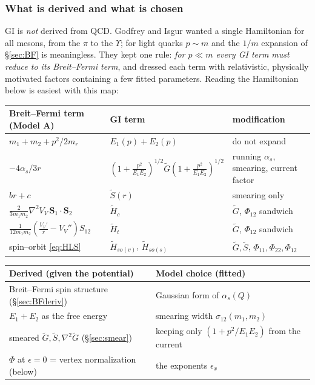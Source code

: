 \documentclass[11pt,a4paper]{article}
\numberwithin{equation}{section}
\theoremstyle{definition}
\theoremstyle{plain}
\theoremstyle{remark}
\numberwithin{algorithm}{section}
\newcommand{\vS}{\bm S}
\newcommand{\as}{\alpha_s}
\newcommand{\mr}{m_r}
\begin{document}
\subsubsection{What is derived and what is chosen}
GI is \emph{not} derived from QCD. Godfrey and Isgur wanted a single Hamiltonian for all mesons, from the $\pi$ to the $\Upsilon$; for light quarks $p\sim m$ and the $1/m$ expansion of \S\ref{sec:BF} is meaningless. They kept one rule: \emph{for $p\ll m$ every GI term must reduce to its Breit--Fermi term}, and dressed each term with relativistic, physically motivated factors containing a few fitted parameters. Reading the Hamiltonian below is easiest with this map:
\begin{center}\small
\renewcommand{\arraystretch}{1.3}
\begin{tabular}{@{}p{4.6cm}p{5.6cm}p{4.2cm}@{}}\toprule
Breit--Fermi term (Model A) & GI term & modification\\\midrule
$m_1+m_2+p^2/2\mr$ & $E_1(p)+E_2(p)$ & do not expand\\
$-4\as/3r$ & $(1+\frac{p^2}{E_1E_2})^{1/2}\tilde G(1+\frac{p^2}{E_1E_2})^{1/2}$ & running $\as$, smearing, current factor\\
$br+c$ & $\tilde S(r)$ & smearing only\\
$\frac{2}{3m_1m_2}\nabla^2V_V\,\vS_1\cdot\vS_2$ & $\tilde H_c$ & $\tilde G$, $\Phi_{12}$ sandwich\\
$\frac{1}{12m_1m_2}(\frac{V_V'}r-V_V'')S_{12}$ & $\tilde H_t$ & $\tilde G$, $\Phi_{12}$ sandwich\\
spin--orbit \eqref{eq:HLS} & $\tilde H_{so(v)}$, $\tilde H_{so(s)}$ & $\tilde G,\tilde S$, $\Phi_{11},\Phi_{22},\Phi_{12}$\\\bottomrule
\end{tabular}
\end{center}
\begin{center}\small
\begin{tabular}{@{}ll@{}}\toprule
Derived (given the potential) & Model choice (fitted)\\\midrule
Breit--Fermi spin structure (\S\ref{sec:BFderiv}) & Gaussian form of $\as(Q)$\\
$E_1+E_2$ as the free energy & smearing width $\sigma_{12}(m_1,m_2)$\\
smeared $\tilde G,\tilde S,\nabla^2\tilde G$ (\S\ref{sec:smear}) & keeping only $(1+p^2/E_1E_2)$ from the current\\
$\Phi$ at $\epsilon=0$ = vertex normalization (below) & the exponents $\epsilon_x$\\\bottomrule
\end{tabular}
\end{center}
\end{document}
